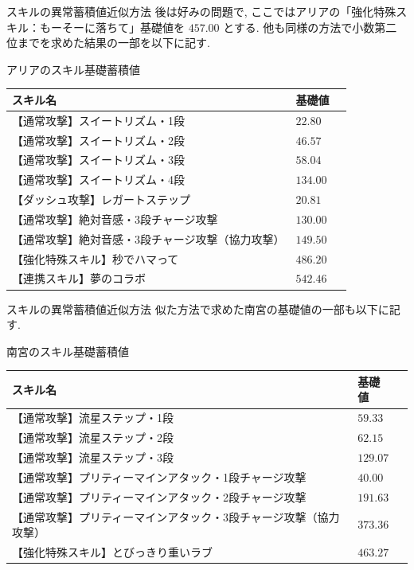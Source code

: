 \documentclass[aspectratio=169]{beamer}
\begin{document}
\begin{frame}{スキルの異常蓄積値近似方法}
後は好みの問題で, ここではアリアの「強化特殊スキル：もーそーに落ちて」基礎値を  $457.00$ とする.
他も同様の方法で小数第二位までを求めた結果の一部を以下に記す.
\begin{block}{アリアのスキル基礎蓄積値}
\small
\begin{tabularx}{\linewidth}{@{}l l X@{}}
スキル名 & 基礎値 \\
\midrule
【通常攻撃】スイートリズム・1段 & $22.80$ \\
【通常攻撃】スイートリズム・2段 & $46.57$ \\
【通常攻撃】スイートリズム・3段 & $58.04$ \\
【通常攻撃】スイートリズム・4段 & $134.00$ \\
【ダッシュ攻撃】レガートステップ & $20.81$ \\
【通常攻撃】絶対音感・3段チャージ攻撃 & $130.00$ \\
【通常攻撃】絶対音感・3段チャージ攻撃（協力攻撃） & $149.50$ \\
【強化特殊スキル】秒でハマって & $486.20$ \\
【連携スキル】夢のコラボ & $542.46$
\end{tabularx}
\end{block}
\end{frame}

\begin{frame}{スキルの異常蓄積値近似方法}
似た方法で求めた南宮の基礎値の一部も以下に記す.

\begin{block}{南宮のスキル基礎蓄積値}
\small
\begin{tabularx}{\linewidth}{@{}l l X@{}}
スキル名 & 基礎値 \\
\midrule
【通常攻撃】流星ステップ・1段 & $59.33$ \\
【通常攻撃】流星ステップ・2段 & $62.15$ \\
【通常攻撃】流星ステップ・3段 & $129.07$ \\
【通常攻撃】プリティーマインアタック・1段チャージ攻撃 & $40.00$ \\
【通常攻撃】プリティーマインアタック・2段チャージ攻撃 & $191.63$ \\
【通常攻撃】プリティーマインアタック・3段チャージ攻撃（協力攻撃） & $373.36$ \\
【強化特殊スキル】とびっきり重いラブ & $463.27$ 
\end{tabularx}
\end{block}
\end{frame}
\end{document}

